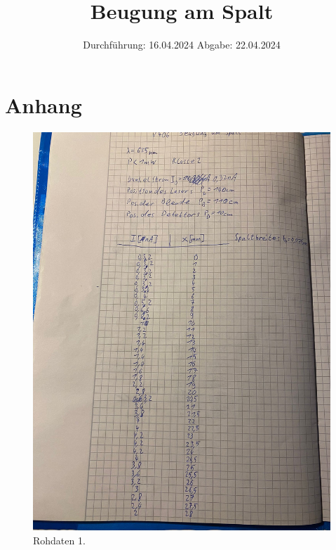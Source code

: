 

\subject{V406}
\title{Beugung am Spalt}
\date{%
  Durchführung: 16.04.2024
  \hspace{3em}
  Abgabe: 22.04.2024
}



\maketitle
\thispagestyle{empty}
\tableofcontents
\newpage






\printbibliography{}

\section{Anhang}

\begin{figure}[H]
  \includegraphics[width=\textwidth, height=15cm]{Bilder/rohdaten1.JPG}
  \caption{Rohdaten 1.}
\end{figure}

